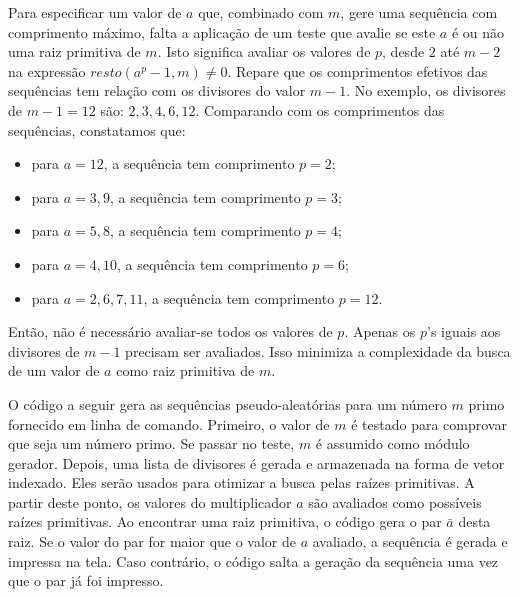 \documentclass[a4paper,12pt,oneside,onecolumn]{uerj}
\begin{document}
Para especificar um valor de $a$ que, combinado com $m$, gere uma sequência com comprimento máximo, falta a aplicação de um teste que avalie se este $a$ é ou não uma raiz primitiva de $m$. Isto significa avaliar os valores de $p$, desde $2$ até $m-2$ na expressão $resto(a^{p}-1,m)\neq0$. Repare que os comprimentos efetivos das sequências tem relação com os divisores do valor $m-1$. No exemplo, os divisores de $m-1=12$ são: $2, 3, 4, 6, 12$. Comparando com os comprimentos das sequências, constatamos que:

\begin{itemize}
    \item para $a=12$, a sequência tem comprimento $p=2$;
    \item para $a=3,9$, a sequência tem comprimento $p=3$;
    \item para $a=5,8$, a sequência tem comprimento $p=4$;
    \item para $a=4,10$, a sequência tem comprimento $p=6$;
    \item para $a=2,6,7,11$, a sequência tem comprimento $p=12$.
\end{itemize}

\noindent Então, não é necessário avaliar-se todos os valores de $p$. Apenas os $p$'s iguais aos divisores de $m-1$ precisam ser avaliados. Isso minimiza a complexidade da busca de um valor de $a$ como raiz primitiva de $m$.

O código a seguir gera as sequências pseudo-aleatórias para um número $m$ primo fornecido em linha de comando. Primeiro, o valor de $m$ é testado para comprovar que seja um número primo. Se passar no teste, $m$ é assumido como módulo gerador. Depois, uma lista de divisores é gerada e armazenada na forma de vetor indexado. Eles serão usados para otimizar a busca pelas raízes primitivas. A partir deste ponto, os valores do multiplicador $a$ são avaliados como possíveis raízes primitivas. Ao encontrar uma raiz primitiva, o código gera o par $\bar a$ desta raiz. Se o valor do par for maior que o valor de $a$ avaliado, a sequência é gerada e impressa na tela. Caso contrário, o código salta a geração da sequência uma vez que o par já foi impresso.
\end{document}
